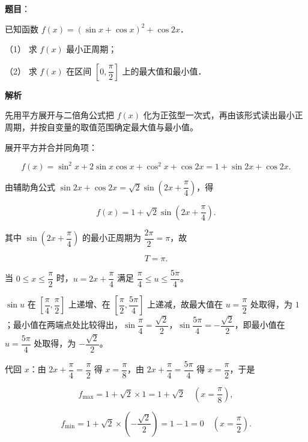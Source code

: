 \begin{answer}

\textbf{题目}：

已知函数 \(f(x)=(\sin x+\cos x)^2+\cos 2x\)．

（1） 求 \(f(x)\) 最小正周期；

（2） 求 \(f(x)\) 在区间 \(\left[0,\dfrac{\pi}{2}\right]\) 上的最大值和最小值．

\textbf{解析}

先用平方展开与二倍角公式把 \(f(x)\) 化为正弦型一次式，再由该形式读出最小正周期，并按自变量的取值范围确定最大值与最小值。


展开平方并合并同角项：

\nopagebreak[4]
\[
f(x)=\sin^2x+2\sin x\cos x+\cos^2x+\cos 2x=1+\sin 2x+\cos 2x .
\]

由辅助角公式 \(\sin 2x+\cos 2x=\sqrt{2}\sin\left(2x+\dfrac{\pi}{4}\right)\)，得

\nopagebreak[4]
\[
f(x)=1+\sqrt{2}\sin\left(2x+\dfrac{\pi}{4}\right).
\]

其中 \(\sin\left(2x+\dfrac{\pi}{4}\right)\) 的最小正周期为 \(\dfrac{2\pi}{2}=\pi\)，故

\nopagebreak[4]
\[
T=\pi .
\]


当 \(0\leqslant x\leqslant\dfrac{\pi}{2}\) 时，\(u=2x+\dfrac{\pi}{4}\) 满足 \(\dfrac{\pi}{4}\leqslant u\leqslant\dfrac{5\pi}{4}\)。

\(\sin u\) 在 \(\left[\dfrac{\pi}{4},\dfrac{\pi}{2}\right]\) 上递增、在 \(\left[\dfrac{\pi}{2},\dfrac{5\pi}{4}\right]\) 上递减，故最大值在 \(u=\dfrac{\pi}{2}\) 处取得，为 \(1\)；最小值在两端点处比较得出，\(\sin\dfrac{\pi}{4}=\dfrac{\sqrt{2}}{2}\)，\(\sin\dfrac{5\pi}{4}=-\dfrac{\sqrt{2}}{2}\)，即最小值在 \(u=\dfrac{5\pi}{4}\) 处取得，为 \(-\dfrac{\sqrt{2}}{2}\)。

代回 \(x\)：由 \(2x+\dfrac{\pi}{4}=\dfrac{\pi}{2}\) 得 \(x=\dfrac{\pi}{8}\)，由 \(2x+\dfrac{\pi}{4}=\dfrac{5\pi}{4}\) 得 \(x=\dfrac{\pi}{2}\)，于是

\nopagebreak[4]
\[
f_{\max}=1+\sqrt{2}\times1=1+\sqrt{2}\quad\left(x=\dfrac{\pi}{8}\right),
\]

\nopagebreak[4]
\[
f_{\min}=1+\sqrt{2}\times\left(-\dfrac{\sqrt{2}}{2}\right)=1-1=0\quad\left(x=\dfrac{\pi}{2}\right).
\]


\end{answer}
